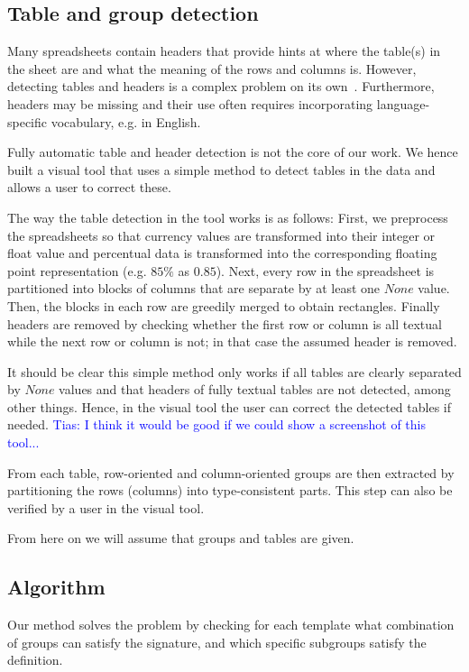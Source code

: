 \documentclass{sig-alternate-05-2015}
\newcommand{\tias}[1]{\textcolor{blue}{{\sc Tias:} #1}\xspace}
\begin{document}
\subsection{Table and group detection} \label{sec:make_groups}
Many spreadsheets contain headers that provide hints at where the table(s) in the sheet are and what the meaning of the rows and columns is. However, detecting tables and headers is a complex problem on its own~\cite{header}. Furthermore, headers may be missing and their use often requires incorporating language-specific vocabulary, e.g. in English.

Fully automatic table and header detection is not the core of our work. We hence built a visual tool that uses a simple method to detect tables in the data and allows a user to correct these.

The way the table detection in the tool works is as follows:
First, we preprocess the spreadsheets so that currency values are transformed into their integer or float value and percentual data is transformed into the corresponding floating point representation (e.g. $85\%$ as $0.85$).
Next, every row in the spreadsheet is partitioned into blocks of columns that are separate by at least one $None$ value. Then, the blocks in each row are greedily merged to obtain rectangles. Finally headers are removed by checking whether the first row or column is all textual while the next row or column is not; in that case the assumed header is removed.

It should be clear this simple method only works if all tables are clearly separated by $None$ values and that headers of fully textual tables are not detected, among other things. Hence, in the visual tool the user can correct the detected tables if needed. \tias{I think it would be good if we could show a screenshot of this tool...}

From each table, row-oriented and column-oriented groups are then extracted by partitioning the rows (columns) into type-consistent parts. This step can also be verified by a user in the visual tool.

From here on we will assume that groups and tables are given.

\newcommand{\temps}{\ensuremath{S}}
\subsection{Algorithm} \label{sec:algo}
Our method solves the \tcl problem by checking for each template what combination of groups can satisfy the signature, and which specific subgroups satisfy the definition.
\end{document}
